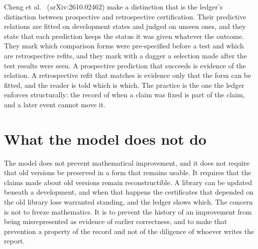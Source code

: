 Cheng et al.\ \cite{Cheng26} (arXiv:2610.02462) make a distinction that is the ledger's distinction between prospective and retrospective certification. Their predictive relations are fitted on development states and judged on unseen ones, and they state that each prediction keeps the status it was given whatever the outcome. They mark which comparison forms were pre-specified before a test and which are retrospective refits, and they mark with a dagger a selection made after the test results were seen. A prospective prediction that succeeds is evidence of the relation. A retrospective refit that matches is evidence only that the form can be fitted, and the reader is told which is which. The practice is the one the ledger enforces structurally: the record of when a claim was fixed is part of the claim, and a later event cannot move it.

\section{What the model does not do}

The model does not prevent mathematical improvement, and it does not require that old versions be preserved in a form that remains usable. It requires that the claims made about old versions remain reconstructible. A library can be updated beneath a development, and when that happens the certificates that depended on the old library lose warranted standing, and the ledger shows which. The concern is not to freeze mathematics. It is to prevent the history of an improvement from being misrepresented as evidence of earlier correctness, and to make that prevention a property of the record and not of the diligence of whoever writes the report.
